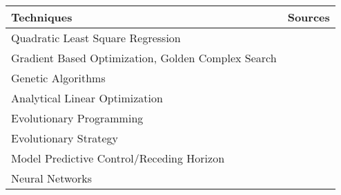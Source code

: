 \begin{table}[ht]
\begin{tabular}{L{8cm} p{5cm}}
\toprule
Techniques 			&       Sources	 	\\
\midrule \midrule
Quadratic Least Square Regression	&  \cite{Ahn2001}  \\

Gradient Based Optimization, Golden Complex Search  & \cite{Huh2008}\cite{Atthajariyakul2004} \\





Genetic Algorithms 	& \cite{LuLu2004}\cite{LuLu2005Part2}\cite{LuLu2005HVACSystemOptimization}\cite{Nassif2005}\cite{Wang2000Model-basedAlgorithm}\cite{XuXinhua2009} \cite{Mossolly-Ghali-Ghaddar_2009_Energy}\cite{Congradac2009HVACAlgorithms}\cite{Jin2005Prediction-basedSystems}\cite{WeiXiupeng2014ModelingAndOptimizationOfAChillerPlant}	\\


Analytical Linear Optimization 	& 	\cite{Cui2004} \\

Evolutionary Programming    & 	\cite{Fong2006HVACProgramming}\cite{Kusiak2011MultiObjective}	 \\

Evolutionary Strategy       &  \cite{Kusiak2010}  \\

Model Predictive Control/Receding Horizon    &  \cite{Henze2005}\cite{Gruber2014AlternativeBuildings}\cite{Freire2008PredictiveSavings}\cite{Kusiak2010ReheatBox}\cite{XuMin2005}\cite{Yuan2006Multiple-zoneStrategy} \\

Neural Networks     &  \cite{Ning2010Neuro-optimalSystem}\cite{Kusiak2010}\cite{Guo2007}\cite{Kusiak2012ModelingAndOptimizationOfHVAC}\cite{Kusiak2011OptimizationOfAnHVACSystemWithAStrength}\cite{Kusiak2014MinimizationOfEnergyConsumptionInHVAC}	 \\


\end{tabular}
\end{table}
